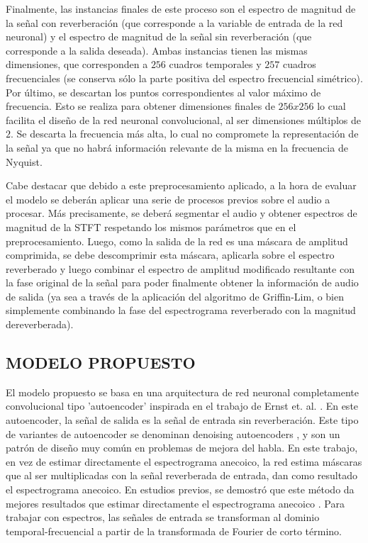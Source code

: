 Finalmente, las instancias finales de este proceso son el espectro de magnitud de la señal con reverberación (que corresponde a la variable de entrada de la red neuronal) y el espectro de magnitud de la señal sin reverberación (que corresponde a la salida deseada). Ambas instancias tienen las mismas dimensiones, que corresponden a $256$ cuadros temporales y $257$ cuadros frecuenciales (se conserva sólo la parte positiva del espectro frecuencial simétrico). Por último, se descartan los puntos correspondientes al valor máximo de frecuencia. Esto se realiza para obtener dimensiones finales de $256x256$ lo cual facilita el diseño de la red neuronal convolucional, al ser dimensiones múltiplos de $2$. Se descarta la frecuencia más alta, lo cual no compromete la representación de la señal ya que no habrá información relevante de la misma en la frecuencia de Nyquist.

Cabe destacar que debido a este preprocesamiento aplicado, a la hora de evaluar el modelo se deberán aplicar una serie de procesos previos sobre el audio a procesar. Más precisamente, se deberá segmentar el audio y obtener espectros de magnitud de la STFT respetando los mismos parámetros que en el preprocesamiento. Luego, como la salida de la red es una máscara de amplitud comprimida, se debe descomprimir esta máscara, aplicarla sobre el espectro reverberado y luego combinar el espectro de amplitud modificado resultante con la fase original de la señal para poder finalmente obtener la información de audio de salida (ya sea a través de la aplicación del algoritmo de Griffin-Lim, o bien simplemente combinando la fase del espectrograma reverberado con la magnitud dereverberada).


\subsection[Modelo propuesto]{MODELO PROPUESTO}

El modelo propuesto se basa en una arquitectura de red neuronal completamente convolucional tipo 'autoencoder' inspirada en el trabajo de Ernst et. al. \cite{FCN}. En este autoencoder, la señal de salida es la señal de entrada sin reverberación. Este tipo de variantes de autoencoder se denominan denoising autoencoders \cite{DAE}, y son un patrón de diseño muy común en problemas de mejora del habla. En este trabajo, en vez de estimar directamente el espectrograma anecoico, la red estima máscaras que al ser multiplicadas con la señal reverberada de entrada, dan como resultado el espectrograma anecoico. En estudios previos, se demostró que este método da mejores resultados que estimar directamente el espectrograma anecoico \cite{mask_vs_map}. Para trabajar con espectros, las señales de entrada se transforman al dominio temporal-frecuencial a partir de la transformada de Fourier de corto término.
 
